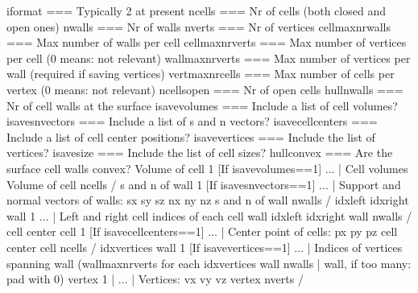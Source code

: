 \documentclass[letterpaper,10pt,english]{sphinxmanual}
\begin{document}
\begin{sphinxVerbatim}[commandchars=\\\{\}]
iformat                          \PYGZlt{}=== Typically 2 at present
ncells                           \PYGZlt{}=== Nr of cells (both \PYGZdq{}closed\PYGZdq{} and \PYGZdq{}open\PYGZdq{} ones)
nwalls                           \PYGZlt{}=== Nr of walls
nverts                           \PYGZlt{}=== Nr of vertices
cell\PYGZus{}max\PYGZus{}nr\PYGZus{}walls                \PYGZlt{}=== Max number of walls per cell
cell\PYGZus{}max\PYGZus{}nr\PYGZus{}verts                \PYGZlt{}=== Max number of vertices per cell (0 means: not relevant)
wall\PYGZus{}max\PYGZus{}nr\PYGZus{}verts                \PYGZlt{}=== Max number of vertices per wall (required if saving vertices)
vert\PYGZus{}max\PYGZus{}nr\PYGZus{}cells                \PYGZlt{}=== Max number of cells per vertex (0 means: not relevant)
ncells\PYGZus{}open                      \PYGZlt{}=== Nr of \PYGZdq{}open\PYGZdq{} cells
hull\PYGZus{}nwalls                      \PYGZlt{}=== Nr of cell walls at the surface
isave\PYGZus{}volumes                    \PYGZlt{}=== Include a list of cell volumes?
isave\PYGZus{}sn\PYGZus{}vectors                 \PYGZlt{}=== Include a list of s and n vectors?
isave\PYGZus{}cellcenters                \PYGZlt{}=== Include a list of cell center positions?
isave\PYGZus{}vertices                   \PYGZlt{}=== Include the list of vertices?
isave\PYGZus{}size                       \PYGZlt{}=== Include the list of cell sizes?
hull\PYGZus{}convex                      \PYGZlt{}=== Are the surface cell walls convex?
Volume of cell 1                 \PYGZbs{}  [If isave\PYGZus{}volumes==1]
...                              |\PYGZhy{} Cell volumes
Volume of cell ncells            /
s and n of wall 1                \PYGZbs{}  [If isave\PYGZus{}sn\PYGZus{}vectors==1]
...                              |\PYGZhy{} Support and normal vectors of walls: s\PYGZus{}x s\PYGZus{}y s\PYGZus{}z n\PYGZus{}x n\PYGZus{}y n\PYGZus{}z
s and n of wall nwalls           /
idx\PYGZus{}left idx\PYGZus{}right wall 1        \PYGZbs{}
...                              |\PYGZhy{} Left and right cell indices of each cell wall
idx\PYGZus{}left idx\PYGZus{}right wall nwalls   /
cell center cell 1               \PYGZbs{}  [If isave\PYGZus{}cellcenters==1]
...                              |\PYGZhy{} Center point of cells: p\PYGZus{}x p\PYGZus{}y p\PYGZus{}z
cell center cell ncells          /
idx\PYGZus{}vertices wall 1              \PYGZbs{}  [If isave\PYGZus{}vertices==1]
...                              |\PYGZhy{} Indices of vertices spanning wall (wall\PYGZus{}max\PYGZus{}nr\PYGZus{}verts for each
idx\PYGZus{}vertices wall nwalls         |  wall, if too many: pad with 0)
vertex 1                         |
...                              |\PYGZhy{} Vertices: v\PYGZus{}x v\PYGZus{}y v\PYGZus{}z
vertex nverts                    /
\end{sphinxVerbatim}
\end{document}
